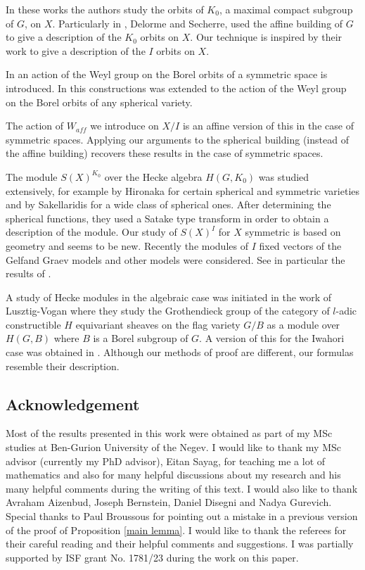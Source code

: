 \documentclass[12pt]{article}
\newcommand{\<}{\langle}
\renewcommand{\>}{\rangle}
\theoremstyle{plain}
\theoremstyle{definition}
\begin{document}
 
 In these works the authors study the orbits of $K_0$, a maximal compact subgroup of $G$, on $X$. 
Particularly in \cite{delorm}, Delorme and Secherre, used the affine building of $G$ to give a description of the $K_0$ orbits on $X$. Our technique is inspired by their work to give a description of the $I$ orbits on $X$. 

In \cite{RichardsonSpringer1990} an action of the Weyl group on the Borel orbits of a symmetric space is introduced. In \cite{knop} this constructions was extended to the action of the Weyl group on the Borel orbits of any spherical variety. 



The action of $W_{aff}$ we introduce on $X/I$ is an affine version of this in the case of symmetric spaces. Applying our arguments to the spherical building (instead of the affine building) recovers these results in the case of symmetric spaces. 


The module $S(X)^{K_0}$ over the Hecke algebra $H(G,K_0)$ was studied extensively, for example by Hironaka \cite{10.2969/jmsj/05130553} for certain spherical and symmetric varieties and by Sakellaridis \cite{sakellaridis2013spherical} for a wide class of spherical ones. After determining the spherical functions, they used a Satake type transform in order to obtain a description of the module. Our study of $S(X)^I$ for $X$ symmetric is based on geometry and seems to be new. 
Recently the modules of $I$ fixed vectors of the Gelfand Graev models and other models were considered. See in particular the results of \cite{ChaSav18}. 


A study of Hecke modules in the algebraic case was initiated in the work of Lusztig-Vogan \cite{Lusztig1983} where they study the Grothendieck group of the category of $l$-adic constructible $H$ equivariant  sheaves on the flag variety $G/B$ as a module over $H(G,B)$ where $B$ is a Borel subgroup of $G$. A version of this for the Iwahori case was obtained in \cite{chen2025singularitiesorbitclosuresloop}. Although our methods of proof are different, our formulas resemble their description. 




\subsection{Acknowledgement}
Most of the results presented in this work were obtained as part of my MSc studies at Ben-Gurion University of the Negev. I would like to thank my MSc advisor (currently my PhD advisor), Eitan Sayag, for teaching me a lot of mathematics and also for many helpful discussions about my research and his many helpful comments during the writing of this text. I would also like to thank Avraham Aizenbud, Joseph Bernstein, Daniel Disegni and Nadya Gurevich. Special thanks to Paul Broussous for pointing out a mistake in a previous version of the proof of Proposition \ref{main lemma}. I would like to thank the referees for their careful reading and their helpful comments and suggestions. I was partially supported by ISF grant No. 1781/23 during the work on this paper.
\end{document}
